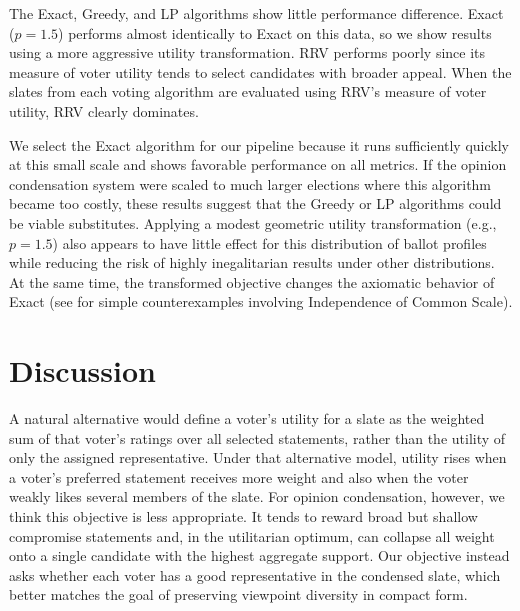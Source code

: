 \documentclass[11pt]{article}
\begin{document}
The Exact, Greedy, and LP algorithms show little performance difference. Exact ($p = 1.5$) performs almost identically to Exact on this data, so we show results using a more aggressive utility transformation. RRV performs poorly since its measure of voter utility tends to select candidates with broader appeal. When the slates from each voting algorithm are evaluated using RRV’s measure of voter utility, RRV clearly dominates.

We select the Exact algorithm for our pipeline because it runs sufficiently quickly at this small scale and shows favorable performance on all metrics. If the opinion condensation system were scaled to much larger elections where this algorithm became too costly, these results suggest that the Greedy or LP algorithms could be viable substitutes. Applying a modest geometric utility transformation (e.g., $p = 1.5$) also appears to have little effect for this distribution of ballot profiles while reducing the risk of highly inegalitarian results under other distributions.
At the same time, the transformed objective changes the axiomatic behavior of Exact (see  for simple counterexamples involving Independence of Common Scale).


\section{Discussion}

A natural alternative would define a voter's utility for a slate as the weighted sum of that voter's ratings over all selected statements, rather than the utility of only the assigned representative.
Under that alternative model, utility rises when a voter's preferred statement receives more weight and also when the voter weakly likes several members of the slate. For opinion condensation, however, we think this objective is less appropriate. It tends to reward broad but shallow compromise statements and, in the utilitarian optimum, can collapse all weight onto a single candidate with the highest aggregate support. Our objective instead asks whether each voter has a good representative in the condensed slate, which better matches the goal of preserving viewpoint diversity in compact form.

\end{document}
